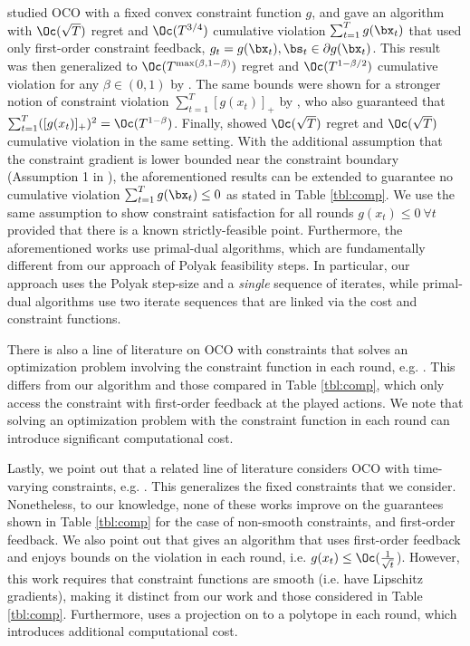 \citet{mahdavi2012trading} studied OCO with a fixed convex constraint function $g$, and gave an algorithm with $\Oc(\sqrt{T})$ regret and $\Oc(T^{3/4})$ cumulative violation $\sum_{t=1}^T g(\bx_t)$ that used only first-order constraint feedback, $g_t = g(\bx_t), \bs_t \in \partial g(\bx_t)$.
This result was then generalized to $\Oc(T^{\max(\beta,1-\beta)})$ regret and $\Oc(T^{1 - \beta/2})$ cumulative violation for any $\beta \in (0,1)$ by \citet{jenatton2016adaptive}.
The same bounds were shown for a stronger notion of constraint violation $\sum_{t=1}^T [g(x_t)]_+$ by \citet{yuan2018online}, who also guaranteed that $\sum_{t=1}^T ([g(x_t)]_+)^2 = \Oc(T^{1 - \beta})$.
Finally, \citet{yu2017online} showed $\Oc(\sqrt{T})$ regret and $\Oc(\sqrt{T})$ cumulative violation in the same setting.
With the additional assumption that the constraint gradient is lower bounded near the constraint boundary (Assumption 1 in \citet{mahdavi2012trading}), the aforementioned results can be extended to guarantee no cumulative violation $\sum_{t=1}^T g(\bx_t) \leq 0$ as stated in Table \ref{tbl:comp}.
We use the same assumption to show constraint satisfaction for all rounds $g(x_t) \leq 0\ \forall t$ provided that there is a known strictly-feasible point.
Furthermore, the aforementioned works use primal-dual algorithms, which are fundamentally different from our approach of Polyak feasibility steps.
In particular, our approach uses the Polyak step-size and a \emph{single} sequence of iterates, while primal-dual algorithms use two iterate sequences that are linked via the cost and constraint functions.

There is also a line of literature on OCO with constraints that solves an optimization problem involving the constraint function in each round, e.g. \cite{yu2020low,yi2021regret,yi2022regret,guo2022online}.
This differs from our algorithm and those compared in Table \ref{tbl:comp}, which only access the constraint with first-order feedback at the played actions.
We note that solving an optimization problem with the constraint function in each round can introduce significant computational cost.

Lastly, we point out that a related line of literature considers OCO with time-varying constraints, e.g. \citep{neely2017online,yu2017online,liakopoulos2019cautious,castiglioni2022unifying,guo2022online,kolev2023online}.
This generalizes the fixed constraints that we consider.
Nonetheless, to our knowledge, none of these works improve on the guarantees shown in Table \ref{tbl:comp} for the case of non-smooth constraints, and first-order feedback.
We also point out that \citet{kolev2023online} gives an algorithm that uses first-order feedback and enjoys bounds on the violation in each round, i.e. $g(x_t) \leq \Oc(\frac{1}{\sqrt{t}}$).
However, this work requires that constraint functions are smooth (i.e. have Lipschitz gradients), making it distinct from our work and those considered in Table \ref{tbl:comp}.
Furthermore, \citet{kolev2023online} uses a projection on to a polytope in each round, which introduces additional computational cost.

